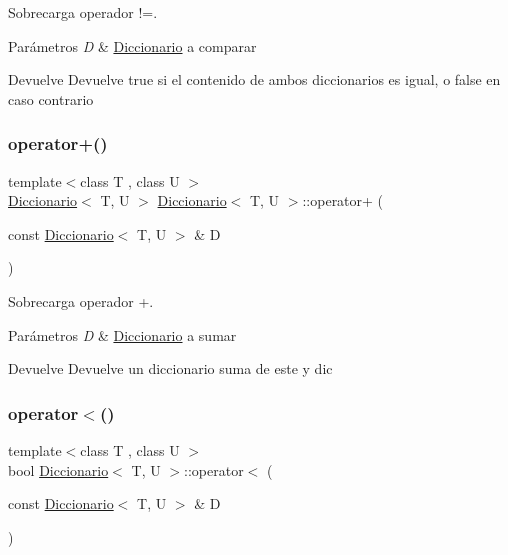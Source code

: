 Sobrecarga operador !=. 


\begin{DoxyParams}{Parámetros}
{\em D} & \hyperlink{classDiccionario}{Diccionario} a comparar \\
\hline
\end{DoxyParams}
\begin{DoxyReturn}{Devuelve}
Devuelve true si el contenido de ambos diccionarios es igual, o false en caso contrario 
\end{DoxyReturn}
\mbox{\label{classDiccionario_a16db419cd9fac934b11496517e5bccae}} 
\subsubsection{\texorpdfstring{operator+()}{operator+()}}
{\footnotesize\ttfamily template$<$class T , class U $>$ \\
\hyperlink{classDiccionario}{Diccionario}$<$ T, U $>$ \hyperlink{classDiccionario}{Diccionario}$<$ T, U $>$\+::operator+ (\begin{DoxyParamCaption}\item[{const \hyperlink{classDiccionario}{Diccionario}$<$ T, U $>$ \&}]{D }\end{DoxyParamCaption})}



Sobrecarga operador +. 


\begin{DoxyParams}{Parámetros}
{\em D} & \hyperlink{classDiccionario}{Diccionario} a sumar \\
\hline
\end{DoxyParams}
\begin{DoxyReturn}{Devuelve}
Devuelve un diccionario suma de este y dic 
\end{DoxyReturn}
\mbox{\label{classDiccionario_ad8ad2b8e7bb2fb099518e6fe2b70e4de}} 
\subsubsection{\texorpdfstring{operator$<$()}{operator<()}}
{\footnotesize\ttfamily template$<$class T , class U $>$ \\
bool \hyperlink{classDiccionario}{Diccionario}$<$ T, U $>$\+::operator$<$ (\begin{DoxyParamCaption}\item[{const \hyperlink{classDiccionario}{Diccionario}$<$ T, U $>$ \&}]{D }\end{DoxyParamCaption})}



